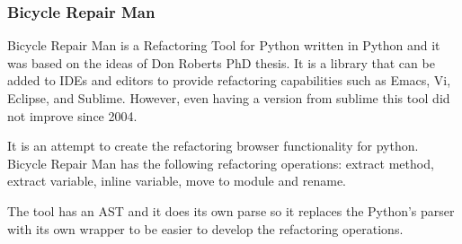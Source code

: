 
\subsubsection{Bicycle Repair Man}

Bicycle Repair Man is a Refactoring Tool for Python written in Python and it was based on the ideas of Don Roberts PhD thesis. It is a library that can be added to IDEs and editors to provide refactoring capabilities such as Emacs, Vi, Eclipse, and Sublime. However, even having a version from sublime this tool did not improve since 2004.

It is an attempt to create the refactoring browser functionality for python. Bicycle Repair Man has the following refactoring operations:
extract method, extract variable, inline variable, move to module and rename.

The tool has an AST and it does its own parse so it replaces the Python's parser with its own wrapper to be easier to develop the refactoring operations.


